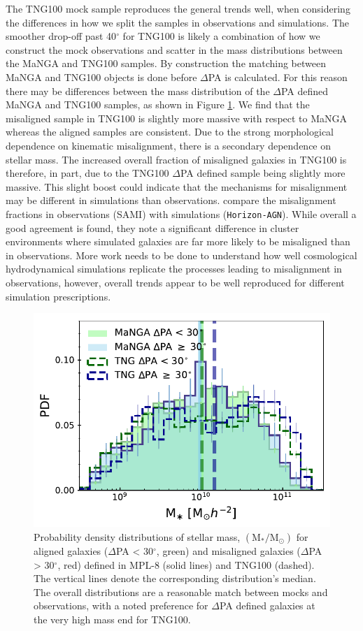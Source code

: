 The TNG100 mock sample reproduces the general trends well, when considering the differences in how we split the samples in observations and simulations. The smoother drop-off past 40$^{\circ}$ for TNG100 is likely a combination of how we construct the mock observations and scatter in the mass distributions between the MaNGA and TNG100 samples. By construction the matching between MaNGA and TNG100 objects is done before $\Delta$PA is calculated. For this reason there may be differences between the mass distribution of the $\Delta$PA defined MaNGA and TNG100 samples, as shown in Figure \ref{fig:TNG_mpl8_stelM}. We find that the misaligned sample in TNG100 is slightly more massive with respect to MaNGA whereas the aligned samples are consistent. Due to the strong morphological dependence on kinematic misalignment, there is a secondary dependence on stellar mass. The increased overall fraction of misaligned galaxies in TNG100 is therefore, in part, due to the TNG100 $\Delta$PA defined sample being slightly more massive. This slight boost could indicate that the mechanisms for misalignment may be different in simulations than observations. \citet{khim2019} compare the misalignment fractions in observations (SAMI) with simulations (\texttt{Horizon-AGN}). While overall a good agreement is found, they note a significant difference in cluster environments where simulated galaxies are far more likely to be misaligned than in observations. More work needs to be done to understand how well cosmological hydrodynamical simulations replicate the processes leading to misalignment in observations, however, overall trends appear to be well reproduced for different simulation prescriptions.

\begin{figure}
    \centering
	\includegraphics[width=0.85\linewidth]{misalignment_TNG/delPA_split_stelM_tng_comparison.pdf}
    \caption{Probability density distributions of stellar mass, $\mathrm{(M_{\ast}/M_{\odot})}$ for aligned galaxies ($\Delta$PA < 30$^{\circ}$, green) and misaligned galaxies ($\Delta$PA > 30$^{\circ}$, red) defined in MPL-8 (solid lines) and TNG100 (dashed). The vertical lines denote the corresponding distribution's median. The overall distributions are a reasonable match between mocks and observations, with a noted preference for $\Delta$PA defined galaxies at the very high mass end for TNG100. }
    \label{fig:TNG_mpl8_stelM}
\end{figure}

